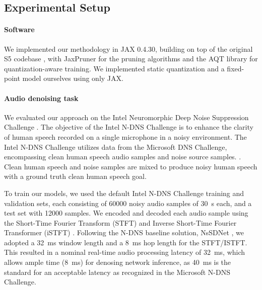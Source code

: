 \subsection{Experimental Setup}



\paragraph{Software}
We implemented our methodology in JAX 0.4.30, building on top of the original S5 codebase \cite{DBLP:conf/iclr/SmithWL23}, with JaxPruner \cite{DBLP:journals/corr/abs-2304-14082} for the pruning algorithms and the AQT library \cite{aqt} for quantization-aware training. We implemented static quantization and a fixed-point model ourselves using only JAX.

\paragraph{Audio denoising task}

We evaluated our approach on the Intel Neuromorphic Deep Noise Suppression Challenge \cite{Timcheck_2023}.
%
The objective of the Intel N-DNS Challenge is to enhance the clarity of human speech recorded on a single microphone in a noisy environment.
%
The Intel N-DNS Challenge utilizes data from the Microsoft DNS Challenge,  encompassing clean human speech audio samples and noise source samples.  \cite{reddy2020interspeech, reddy2021icassp, reddy2021interspeech, dubey2024icassp}.
Clean human speech and noise samples are mixed to produce noisy human speech with a ground truth clean human speech goal.

To train our models, we used the default Intel N-DNS Challenge training and validation sets, each consisting of \qty{60000}{} noisy audio samples of \qty{30}{\s} each, and a test set with \qty{12000}{} samples. 
%
We encoded and decoded each audio sample using the Short-Time Fourier Transform (STFT) and Inverse Short-Time Fourier Transformer (iSTFT) \cite{grochenig2013foundations}. 
%
Following the N-DNS baseline solution, NsSDNet \cite{shrestha2024efficient}, we adopted a \qty{32}{\milli\s} window length and a \qty{8}{\milli\s} hop length for the STFT/ISTFT.
%
This resulted in a nominal real-time audio processing latency of \qty{32}{\milli\s}, which allows ample time (\qty{8}{\milli\s}) for denosing network inference, as \qty{40}{\milli\s} is the standard for an acceptable latency as recognized in the Microsoft N-DNS Challenge. 

